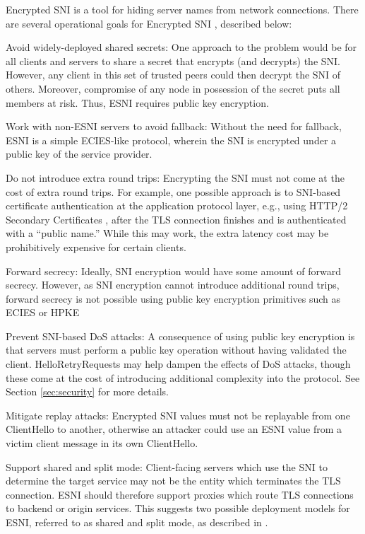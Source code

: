 \documentclass{article}
\theoremstyle{definition}
\begin{document}
Encrypted SNI is a tool for hiding server names from network connections. There are several operational goals 
for Encrypted SNI \cite{requirements}, described below:
%
\begin{compactitem}
  \item Avoid widely-deployed shared secrets: One approach to the problem would be for all
  clients and servers to share a secret that encrypts (and decrypts) the SNI. However, any 
  client in this set of trusted peers could then decrypt the SNI of others. Moreover, compromise
  of any node in possession of the secret puts all members at risk. Thus, ESNI requires 
  public key encryption.
  \item Work with non-ESNI servers to avoid fallback: Without the need for fallback, ESNI 
  is a simple ECIES-like protocol, wherein the SNI is encrypted under a public key of the 
  service provider.
  \item Do not introduce extra round trips: Encrypting the SNI must not come at the cost of 
  extra round trips. For example, one possible approach is to SNI-based certificate authentication
  at the application protocol layer, e.g., using HTTP/2 Secondary Certificates \cite{ietf-httpbis-http2-secondary-certs-04}, after
  the TLS connection finishes and is authenticated with a ``public name.'' While this may work,
  the extra latency cost may be prohibitively expensive for certain clients.
  \item Forward secrecy: Ideally, SNI encryption would have some amount of forward secrecy.
  However, as SNI encryption cannot introduce additional round trips, forward secrecy is not
  possible using public key encryption primitives such as ECIES \cite{shoup2001proposal} or HPKE \cite{irtf-cfrg-hpke-00}
  \item Prevent SNI-based DoS attacks: A consequence of using public key encryption is that
  servers must perform a public key operation without having validated the client. HelloRetryRequests
  may help dampen the effects of DoS attacks, though these come at the cost of introducing
  additional complexity into the protocol. See Section \ref{sec:security} for more details.
  \item Mitigate replay attacks: Encrypted SNI values must not be replayable from one 
  ClientHello to another, otherwise an attacker could use an ESNI value from a victim client
  message in its own ClientHello.
  \item Support shared and split mode: Client-facing servers which use the SNI to determine 
  the target service may not be the entity which terminates the TLS connection. ESNI should therefore
  support proxies which route TLS connections to backend or origin services. This suggests two
  possible deployment models for ESNI, referred to as shared and split mode, as described in
  \cite{ietf-tls-esni-04}.
\end{compactitem}
%
\end{document}

